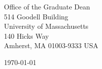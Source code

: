 \begin{minipage}{0.49\textwidth}
\begin{flushleft}
  \noindent
   Office of the Graduate Dean\\
514 Goodell Building\\
University of Massachusetts\\
140 Hicks Way\\
Amherst, MA 01003-9333 USA
\end{flushleft}
\end{minipage}
\begin{minipage}{0.47\textwidth}
\begin{flushright}
\today
\end{flushright}
\end{minipage} \\

\newcommand{\univ}{University of Massachusetts}
\newcommand{\univshort}{UMass}
\newcommand{\degree}{M.Sc.}
\newcommand{\dept}{Computer Science}
